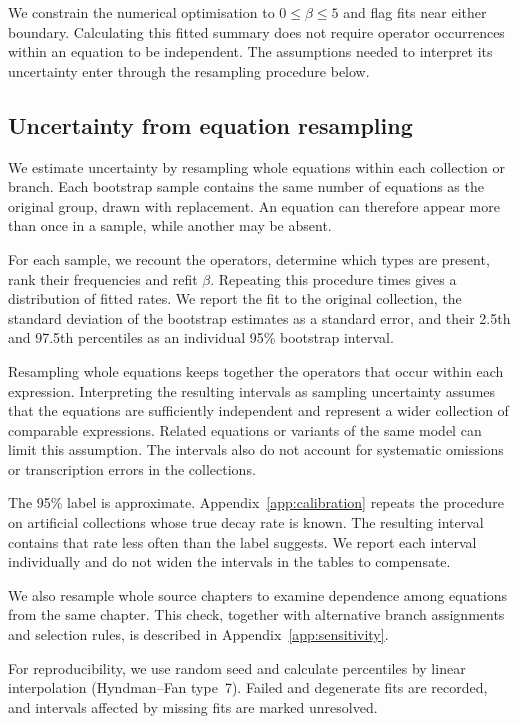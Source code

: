 \documentclass[10pt]{article}
\begin{document}
We constrain the numerical optimisation to $0\leq\beta\leq5$ and flag fits near either boundary. Calculating this fitted summary does not require operator occurrences within an equation to be independent. The assumptions needed to interpret its uncertainty enter through the resampling procedure below.

\subsection{Uncertainty from equation resampling}
We estimate uncertainty by resampling whole equations within each collection or branch. Each bootstrap sample contains the same number of equations as the original group, drawn with replacement. An equation can therefore appear more than once in a sample, while another may be absent.

For each sample, we recount the operators, determine which types are present, rank their frequencies and refit $\beta$. Repeating this procedure \bootN{} times gives a distribution of fitted rates. We report the fit to the original collection, the standard deviation of the bootstrap estimates as a standard error, and their 2.5th and 97.5th percentiles as an individual 95\% bootstrap interval.

Resampling whole equations keeps together the operators that occur within each expression. Interpreting the resulting intervals as sampling uncertainty assumes that the equations are sufficiently independent and represent a wider collection of comparable expressions. Related equations or variants of the same model can limit this assumption. The intervals also do not account for systematic omissions or transcription errors in the collections.

The 95\% label is approximate. Appendix~\ref{app:calibration} repeats the procedure on artificial collections whose true decay rate is known. The resulting interval contains that rate less often than the label suggests. We report each interval individually and do not widen the intervals in the tables to compensate.

We also resample whole source chapters to examine dependence among equations from the same chapter. This check, together with alternative branch assignments and selection rules, is described in Appendix~\ref{app:sensitivity}.

For reproducibility, we use random seed \bootSeed{} and calculate percentiles by linear interpolation (Hyndman--Fan type~7). Failed and degenerate fits are recorded, and intervals affected by missing fits are marked unresolved.
\end{document}
